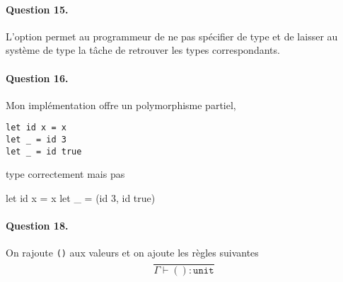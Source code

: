 \documentclass{article}
\theoremstyle{thm}
\theoremstyle{def}
\theoremstyle{dem}
\newcommand{\code}[1]{\texttt{#1}}
\begin{document}
\paragraph{Question 15.}
L'option permet au programmeur de ne pas spécifier de type et de laisser au système de type la tâche de retrouver les types correspondants.

\paragraph{Question 16.}
Mon implémentation offre un polymorphisme partiel,
\begin{lstlisting}
let id x = x
let _ = id 3
let _ = id true
\end{lstlisting}
type correctement mais pas
\begin{listings}
let id x = x
let _ = (id 3, id true)
\end{listings}

\paragraph{Question 18.}
On rajoute \code{()} aux valeurs et on ajoute les règles suivantes
\[ \frac{}{\Gamma\vdash ():\code{unit}} \]
\end{document}
